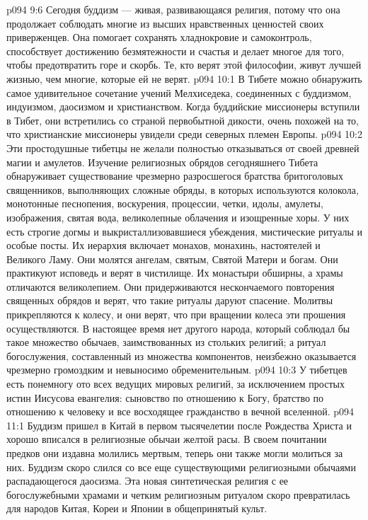 \vs p094 9:6 Сегодня буддизм --- живая, развивающаяся религия, потому что она продолжает соблюдать многие из высших нравственных ценностей своих приверженцев. Она помогает сохранять хладнокровие и самоконтроль, способствует достижению безмятежности и счастья и делает многое для того, чтобы предотвратить горе и скорбь. Те, кто верят этой философии, живут лучшей жизнью, чем многие, которые ей не верят.
\vs p094 10:1 В Тибете можно обнаружить самое удивительное сочетание учений Мелхиседека, соединенных с буддизмом, индуизмом, даосизмом и христианством. Когда буддийские миссионеры вступили в Тибет, они встретились со страной первобытной дикости, очень похожей на то, что христианские миссионеры увидели среди северных племен Европы.
\vs p094 10:2 Эти простодушные тибетцы не желали полностью отказываться от своей древней магии и амулетов. Изучение религиозных обрядов сегодняшнего Тибета обнаруживает существование чрезмерно разросшегося братства бритоголовых священников, выполняющих сложные обряды, в которых используются колокола, монотонные песнопения, воскурения, процессии, четки, идолы, амулеты, изображения, святая вода, великолепные облачения и изощренные хоры. У них есть строгие догмы и выкристаллизовавшиеся убеждения, мистические ритуалы и особые посты. Их иерархия включает монахов, монахинь, настоятелей и Великого Ламу. Они молятся ангелам, святым, Святой Матери и богам. Они практикуют исповедь и верят в чистилище. Их монастыри обширны, а храмы отличаются великолепием. Они придерживаются нескончаемого повторения священных обрядов и верят, что такие ритуалы даруют спасение. Молитвы прикрепляются к колесу, и они верят, что при вращении колеса эти прошения осуществляются. В настоящее время нет другого народа, который соблюдал бы такое множество обычаев, заимствованных из стольких религий; а ритуал богослужения, составленный из множества компонентов, неизбежно оказывается чрезмерно громоздким и невыносимо обременительным.
\vs p094 10:3 У тибетцев есть понемногу ото всех ведущих мировых религий, за исключением простых истин Иисусова евангелия: сыновство по отношению к Богу, братство по отношению к человеку и все восходящее гражданство в вечной вселенной.
\vs p094 11:1 Буддизм пришел в Китай в первом тысячелетии после Рождества Христа и хорошо вписался в религиозные обычаи желтой расы. В своем почитании предков они издавна молились мертвым, теперь они также могли молиться за них. Буддизм скоро слился со все еще существующими религиозными обычаями распадающегося даосизма. Эта новая синтетическая религия с ее богослужебными храмами и четким религиозным ритуалом скоро превратилась для народов Китая, Кореи и Японии в общепринятый культ.
